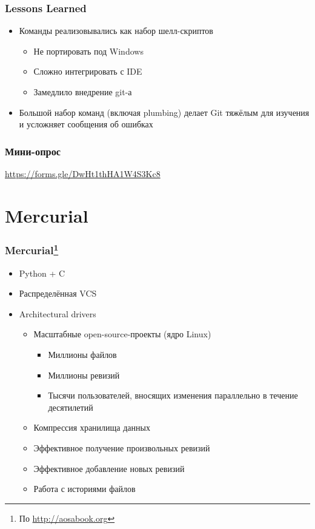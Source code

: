 \documentclass[xetex,mathserif,serif]{beamer}
\begin{document}
	\begin{frame}
		\frametitle{Lessons Learned}
		\begin{itemize}
			\item Команды реализовывались как набор шелл-скриптов
			\begin{itemize}
				\item Не портировать под Windows
				\item Сложно интегрировать с IDE
				\item Замедлило внедрение git-а
			\end{itemize}
			\item Большой набор команд (включая plumbing) делает Git тяжёлым для изучения и усложняет сообщения об ошибках
		\end{itemize}
	\end{frame}

	\begin{frame}
		\frametitle{Мини-опрос}
		\begin{center}
			\url{https://forms.gle/DwHt1thHA1W4S3Kc8}
		\end{center}
	\end{frame}

	\section{Mercurial}

	\begin{frame}
		\frametitle{Mercurial\footnote{\tiny{По \url{http://aosabook.org}}}}
		\begin{itemize}
			\item Python + C
			\item Распределённая VCS
			\item Architectural drivers
			\begin{itemize}
				\item Масштабные open-source-проекты (ядро Linux)
				\begin{itemize}
					\item Миллионы файлов
					\item Миллионы ревизий
					\item Тысячи пользователей, вносящих изменения параллельно в течение десятилетий
				\end{itemize}
				\item Компрессия хранилища данных
				\item Эффективное получение произвольных ревизий
				\item Эффективное добавление новых ревизий
				\item Работа с историями файлов
			\end{itemize}
		\end{itemize}
	\end{frame}
\end{document}
